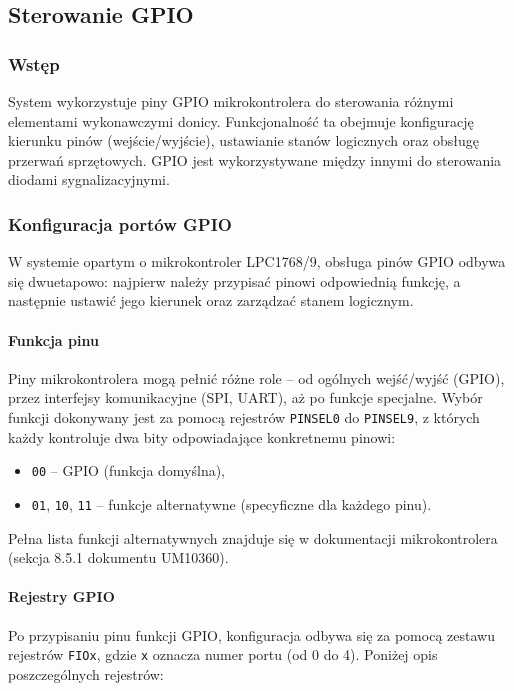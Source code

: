 \subsection{Sterowanie GPIO}

\subsubsection{Wstęp}
System wykorzystuje piny GPIO mikrokontrolera do sterowania różnymi elementami wykonawczymi donicy. Funkcjonalność ta obejmuje konfigurację kierunku pinów (wejście/wyjście), ustawianie stanów logicznych oraz obsługę przerwań sprzętowych. GPIO jest wykorzystywane między innymi do sterowania diodami sygnalizacyjnymi.

\subsubsection{Konfiguracja portów GPIO}

W systemie opartym o mikrokontroler LPC1768/9, obsługa pinów GPIO odbywa się dwuetapowo: najpierw należy przypisać pinowi odpowiednią funkcję, a następnie ustawić jego kierunek oraz zarządzać stanem logicznym.

\paragraph{Funkcja pinu}

Piny mikrokontrolera mogą pełnić różne role – od ogólnych wejść/wyjść (GPIO), przez interfejsy komunikacyjne (SPI, UART), aż po funkcje specjalne. Wybór funkcji dokonywany jest za pomocą rejestrów \texttt{PINSEL0} do \texttt{PINSEL9}, z których każdy kontroluje dwa bity odpowiadające konkretnemu pinowi:

\begin{itemize}
    \item \texttt{00} – GPIO (funkcja domyślna),
    \item \texttt{01}, \texttt{10}, \texttt{11} – funkcje alternatywne (specyficzne dla każdego pinu).
\end{itemize}

Pełna lista funkcji alternatywnych znajduje się w dokumentacji mikrokontrolera (sekcja 8.5.1 dokumentu UM10360).

\paragraph{Rejestry GPIO}

Po przypisaniu pinu funkcji GPIO, konfiguracja odbywa się za pomocą zestawu rejestrów \texttt{FIOx}, gdzie \texttt{x} oznacza numer portu (od 0 do 4). Poniżej opis poszczególnych rejestrów:

